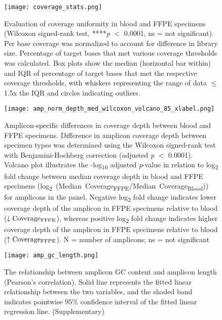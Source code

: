 \documentclass{bmcart}
\begin{document}
\begin{backmatter}
\begin{figure}[!h]
\centering
  \texttt{[image: coverage\_stats.png]}
  \caption[Evaluation of coverage uniformity in blood and FFPE specimens (Wilcoxon signed-rank test, ****\textit{p} $<$ 0.0001, ns = not significant).]{Evaluation of coverage uniformity in blood and FFPE specimens (Wilcoxon signed-rank test, ****\textit{p} $<$ 0.0001, ns = not significant). Per base coverage was normalized to account for difference in library size. Percentage of target bases that met various coverage thresholds was calculated. Box plots show the median (horizontal bar within) and IQR of percentage of target bases that met the respective coverage thresholds, with whiskers representing the range of data $\leq$ 1.5x the IQR and circles indicating outliers.}
  \label{coverage_stats}
\end{figure}

\begin{figure}[!h]
\centering
  \texttt{[image: amp\_norm\_depth\_med\_wilcoxon\_volcano\_85\_xlabel.png]}
  \caption[Amplicon-specific differences in coverage depth between blood and FFPE specimens.]{Amplicon-specific differences in coverage depth between blood and FFPE specimens. Difference in amplicon coverage depth between specimen types was determined using the Wilcoxon signed-rank test with Benjamini-Hochberg correction (adjusted \textit{p} $<$ 0.0001). Volcano plot illustrates the -log\textsubscript{10} adjusted \textit{p}-value in relation to log\textsubscript{2} fold change between median coverage depth in blood and FFPE specimens (\mbox{log\textsubscript{2} (Median Coverage\textsubscript{FFPE}/Median Coverage\textsubscript{Blood})}) for amplicons in the panel. Negative log\textsubscript{2} fold change indicates lower coverage depth of the amplicon in FFPE specimens relative to blood ($\downarrow \text{Coverage\textsubscript{FFPE}}$), whereas positive log\textsubscript{2} fold change indicates higher coverage depth of the amplicon in FFPE specimens relative to blood ($\uparrow\text{Coverage\textsubscript{FFPE}}$). N = number of amplicons; ns = not significant}
  \label{amp_norm_depth_med_wilcoxon_volcano}
\end{figure}

\begin{figure}[!h]
	\centering
	\texttt{[image: amp\_gc\_length.png]}
	\caption[The relationship between amplicon GC content and amplicon length (Pearson's correlation).]{The relationship between amplicon GC content and amplicon length (Pearson's correlation). Solid line represents the fitted linear relationship between the two variables, and the shaded band indicates pointwise 95\% confidence interval of the fitted linear regression line. (Supplementary)}
	\label{amp_gc_length}
\end{figure}


\end{backmatter}
\end{document}
